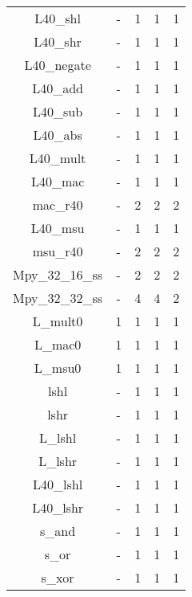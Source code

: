 \begin{longtable}{|c|c|c|c|c|}
L40\_shl                & -       & 1       & 1       & 1        \\
L40\_shr                & -       & 1       & 1       & 1        \\
L40\_negate             & -       & 1       & 1       & 1        \\
L40\_add                & -       & 1       & 1       & 1        \\
L40\_sub                & -       & 1       & 1       & 1        \\
L40\_abs                & -       & 1       & 1       & 1        \\
L40\_mult               & -       & 1       & 1       & 1        \\
L40\_mac                & -       & 1       & 1       & 1        \\
mac\_r40                & -       & 2       & 2       & 2        \\
L40\_msu                & -       & 1       & 1       & 1        \\
msu\_r40                & -       & 2       & 2       & 2        \\
Mpy\_32\_16\_ss         & -       & 2       & 2       & 2        \\
Mpy\_32\_32\_ss         & -       & 4       & 4       & 2        \\
L\_mult0                & 1       & 1       & 1       & 1        \\
L\_mac0                 & 1       & 1       & 1       & 1        \\
L\_msu0                 & 1       & 1       & 1       & 1        \\
lshl                    & -       & 1       & 1       & 1        \\
lshr                    & -       & 1       & 1       & 1        \\
L\_lshl                 & -       & 1       & 1       & 1        \\
L\_lshr                 & -       & 1       & 1       & 1        \\
L40\_lshl               & -       & 1       & 1       & 1        \\
L40\_lshr               & -       & 1       & 1       & 1        \\
s\_and                  & -       & 1       & 1       & 1        \\
s\_or                   & -       & 1       & 1       & 1        \\
s\_xor                  & -       & 1       & 1       & 1        \\

\end{longtable}
